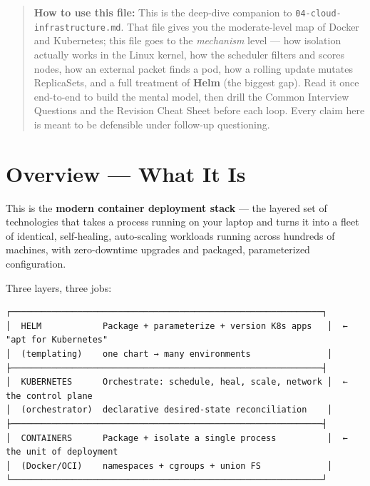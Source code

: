 \documentclass[11pt]{article}
\begin{document}
\makecoverpage

\thispagestyle{empty}
{\hypersetup{hidelinks}\tableofcontents}
\clearpage

\begin{quote}
\textbf{How to use this file:} This is the deep-dive companion to \texttt{04-cloud-infrastructure.md}. That file gives you the moderate-level map of Docker and Kubernetes; this file goes to the \emph{mechanism} level --- how isolation actually works in the Linux kernel, how the scheduler filters and scores nodes, how an external packet finds a pod, how a rolling update mutates ReplicaSets, and a full treatment of \textbf{Helm} (the biggest gap). Read it once end-to-end to build the mental model, then drill the Common Interview Questions and the Revision Cheat Sheet before each loop. Every claim here is meant to be defensible under follow-up questioning.
\end{quote}

\section{Overview --- What It Is}\label{overview--what-it-is}

This is the \textbf{modern container deployment stack} --- the layered set of technologies that takes a process running on your laptop and turns it into a fleet of identical, self-healing, auto-scaling workloads running across hundreds of machines, with zero-downtime upgrades and packaged, parameterized configuration.

Three layers, three jobs:

\setcodelang{}

\begin{verbatim}
┌─────────────────────────────────────────────────────────────┐
│  HELM            Package + parameterize + version K8s apps   │  ← "apt for Kubernetes"
│  (templating)    one chart → many environments               │
├─────────────────────────────────────────────────────────────┤
│  KUBERNETES      Orchestrate: schedule, heal, scale, network │  ← the control plane
│  (orchestrator)  declarative desired-state reconciliation    │
├─────────────────────────────────────────────────────────────┤
│  CONTAINERS      Package + isolate a single process          │  ← the unit of deployment
│  (Docker/OCI)    namespaces + cgroups + union FS             │
└─────────────────────────────────────────────────────────────┘
\end{verbatim}
\end{document}
